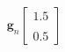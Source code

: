 \documentclass[preview]{standalone}
\begin{document}
\begin{align*}
\mathbf{g}_n \begin{bmatrix} 1.5 \\ \\0.5 \end{bmatrix}
\end{align*}
\end{document}
